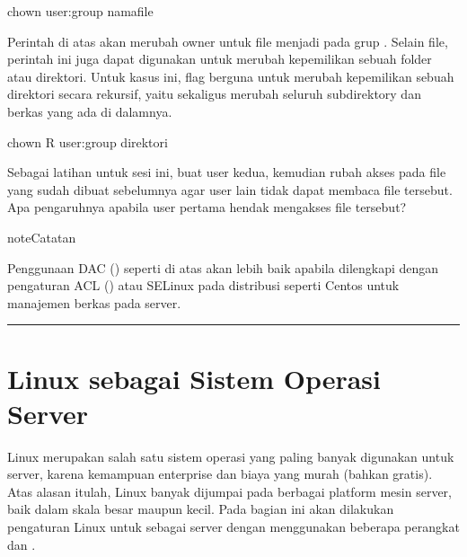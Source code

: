 \documentclass[letterpaper,10pt,english]{sphinxmanual}
\begin{document}
\begin{sphinxVerbatim}[commandchars=\\\{\}]
chown user\PYG{o}{[}:group\PYG{o}{]} namafile
\end{sphinxVerbatim}

Perintah di atas akan merubah owner untuk file  menjadi  pada grup . Selain file, perintah ini juga dapat digunakan untuk merubah kepemilikan sebuah folder atau direktori. Untuk kasus ini, flag  berguna untuk merubah kepemilikan sebuah direktori secara rekursif, yaitu sekaligus merubah seluruh subdirektory dan berkas yang ada di dalamnya.

\begin{sphinxVerbatim}[commandchars=\\\{\}]
chown \PYGZhy{}R user\PYG{o}{[}:group\PYG{o}{]} direktori
\end{sphinxVerbatim}

Sebagai latihan untuk sesi ini, buat user kedua, kemudian rubah akses pada file  yang sudah dibuat sebelumnya agar user lain tidak dapat membaca file tersebut. Apa pengaruhnya apabila user pertama hendak mengakses file tersebut?

\begin{sphinxadmonition}{note}{Catatan}

Penggunaan DAC () seperti di atas akan lebih baik apabila dilengkapi dengan pengaturan ACL () atau SELinux pada distribusi seperti Centos untuk manajemen berkas pada server.
\end{sphinxadmonition}


\bigskip\hrule\bigskip



\section{Linux sebagai Sistem Operasi Server}
\label{\detokenize{sesi1/linuxserver:linux-sebagai-sistem-operasi-server}}\label{\detokenize{sesi1/linuxserver::doc}}
Linux merupakan salah satu sistem operasi yang paling banyak digunakan untuk server, karena kemampuan enterprise dan biaya yang murah (bahkan gratis). Atas alasan itulah, Linux banyak dijumpai pada berbagai platform mesin server, baik dalam skala besar maupun kecil.  Pada bagian ini akan dilakukan pengaturan Linux untuk sebagai server dengan menggunakan beberapa perangkat  dan .
\end{document}

